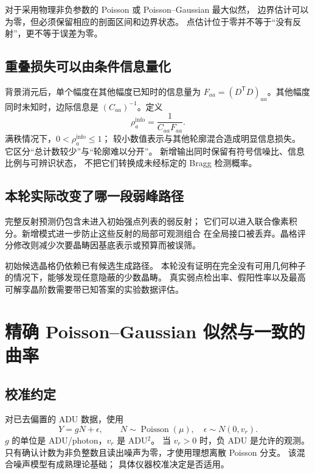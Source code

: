 \documentclass[UTF8,11pt,a4paper,fontset=fandol]{ctexart}
\newcommand{\T}{^{\mathsf T}}
\begin{document}
对于采用物理非负参数的 Poisson 或 Poisson--Gaussian 最大似然，
边界估计可以为零，但必须保留相应的剖面区间和边界状态。
点估计位于零并不等于“没有反射”，更不等于误差为零。

\subsection{重叠损失可以由条件信息量化}

背景消元后，单个幅度在其他幅度已知时的信息量为
$F_{aa}=(D\T D)_{aa}$。其他幅度同时未知时，边际信息是
$(C_{aa})^{-1}$。定义
\begin{equation}
\rho_a^{\mathrm{info}}=
\frac{1}{C_{aa}F_{aa}}.
\end{equation}
满秩情况下，$0<\rho_a^{\mathrm{info}}\leq1$；
较小数值表示与其他轮廓混合造成明显信息损失。
它区分“总计数较少”与“轮廓难以分开”。
新增输出同时保留有符号信噪比、信息比例与可辨识状态，
不把它们转换成未经标定的 Bragg 检测概率。

\subsection{本轮实际改变了哪一段弱峰路径}

完整反射预测仍包含未进入初始强点列表的弱反射；
它们可以进入联合像素积分。新增模式进一步防止这些反射的局部可观测组合
在全局接口被丢弃。晶格评分修改则减少次要晶畴因基底表示或预算而被误筛。

初始候选晶格仍依赖已有候选生成路径。
本轮没有证明在完全没有可用几何种子的情况下，能够发现任意隐蔽的少数晶畴。
真实弱点检出率、假阳性率以及最高可解孪晶阶数需要带已知答案的实验数据评估。

\section{精确 Poisson--Gaussian 似然与一致的曲率}

\subsection{校准约定}

对已去偏置的 ADU 数据，使用
\begin{equation}
Y=gN+\epsilon,\qquad N\sim\operatorname{Poisson}(\mu),\quad
\epsilon\sim N(0,v_r).
\end{equation}
$g$ 的单位是 ADU/photon，$v_r$ 是 ADU$^2$。
当 $v_r>0$ 时，负 ADU 是允许的观测。
只有确认计数为非负整数且读出噪声为零，才使用理想离散 Poisson 分支。
该混合噪声模型有成熟理论基础\cite{chouzenoux2015,foi2008}；
具体仪器校准决定是否适用。
\end{document}
